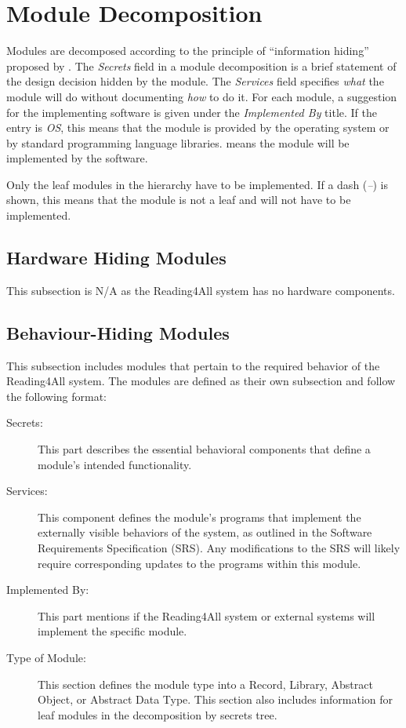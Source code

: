 \documentclass[12pt, titlepage]{article}
\begin{document}
\section{Module Decomposition} \label{SecMD}

Modules are decomposed according to the principle of ``information hiding''
proposed by \citet{ParnasEtAl1984}. The \emph{Secrets} field in a module
decomposition is a brief statement of the design decision hidden by the
module. The \emph{Services} field specifies \emph{what} the module will do
without documenting \emph{how} to do it. For each module, a suggestion for the
implementing software is given under the \emph{Implemented By} title. If the
entry is \emph{OS}, this means that the module is provided by the operating
system or by standard programming language libraries.
\emph{\progname{}} means the
module will be implemented by the \progname{} software.

Only the leaf modules in the hierarchy have to be implemented. If a dash
(\emph{--}) is shown, this means that the module is not a leaf and will not have
to be implemented.

\subsection{Hardware Hiding Modules \label{hhmmain}}
This subsection is N/A as the Reading4All system has no hardware components.

\subsection{Behaviour-Hiding Modules \label{bhmmain}}
This subsection includes modules that pertain to the required
behavior of the Reading4All system.
The modules are defined as their own subsection and follow the following format:

\begin{description}
  \item[Secrets:]This part describes the essential behavioral
    components that define a module's intended functionality.
  \item[Services:]This component defines the module's programs that
    implement the
    externally visible behaviors of the system, as outlined in the
    Software Requirements Specification (SRS). Any modifications to the
    SRS will likely require corresponding updates to the programs
    within this module.
  \item[Implemented By:] This part mentions if the Reading4All system
    or external systems will
    implement the specific module.
  \item[Type of Module:] This section defines the module type into a
    Record, Library, Abstract
    Object, or Abstract Data Type. This section also includes
    information for leaf modules in the decomposition by secrets tree.
\end{description}
\end{document}
